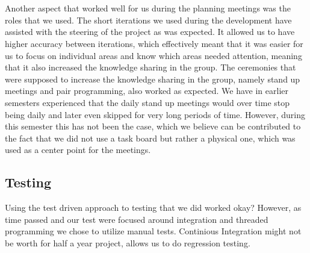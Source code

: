 \\\\
Another aspect that worked well for us during the planning meetings was the roles that we used. 
The short iterations we used during the development have assisted with the steering of the project as was expected. It allowed us to have higher accuracy between iterations, which effectively meant that it was easier for us to focus on individual areas and know which areas needed attention, meaning that it also increased the knowledge sharing in the group. The  ceremonies that were supposed to increase the knowledge sharing in the group, namely stand up meetings and pair programming, also worked as expected. We have in earlier semesters experienced that the daily stand up meetings would over time stop being daily and later even skipped for very long periods of time. However, during this semester this has not been the case, which we believe can be contributed to the fact that we did not use a task board but rather a physical one, which was used as a center point for the meetings. 

\subsection{Testing}
\label{sub:testing}
Using the test driven approach to testing that we did worked okay?
However, as time passed and our test were focused around integration and threaded programming we chose to utilize manual tests. 
Continious Integration might not be worth for half a year project, allows us to do regression testing. 








